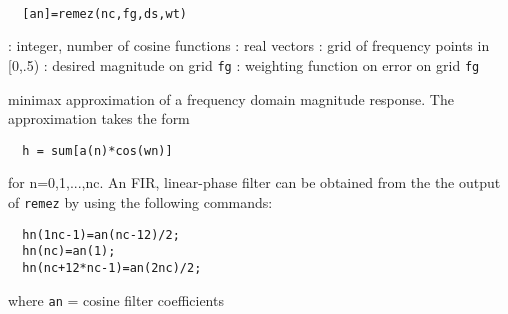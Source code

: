 
\begin{mandesc}
   \\ %
\end{mandesc}
\begin{calling_sequence}
\begin{verbatim}
  [an]=remez(nc,fg,ds,wt)  
\end{verbatim}
\end{calling_sequence}
\begin{parameters}
  \begin{varlist}
    : integer, number of cosine functions
    : real vectors
    : grid of frequency points in [0,.5)
      : desired magnitude on grid \verb!fg!
      : weighting function on error on grid \verb!fg!
  \end{varlist}
\end{parameters}
\begin{mandescription}
  minimax approximation of a frequency domain magnitude response.
  The approximation takes the form
\begin{verbatim}
  h = sum[a(n)*cos(wn)]
\end{verbatim}
for n=0,1,...,nc. An FIR, linear-phase filter
can be obtained from the the output of \verb!remez! by using the
following commands:
\begin{verbatim}
  hn(1nc-1)=an(nc-12)/2;
  hn(nc)=an(1);
  hn(nc+12*nc-1)=an(2nc)/2;
\end{verbatim}
where \verb!an! = cosine filter coefficients
\end{mandescription}
\begin{manseealso}
\end{manseealso}
